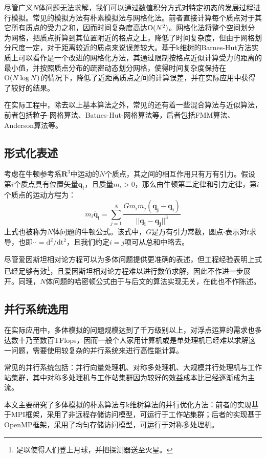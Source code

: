 \documentclass[lang=cn,11pt,a4paper,cite=authoryear]{elegantpaper}
\begin{document}
尽管广义$N$体问题无法求解，我们可以通过数值积分方式对特定初态的发展过程进行模拟。常见的模拟方法有朴素模拟法与网格化法。前者直接计算每个质点对于其它所有质点的受力之和，因而时间复杂度高达$\text O(N^2)$。网格化法将整个空间划分为网格，把质点折算到其位置附近的格点之上，降低了时间复杂度，但由于网格划分尺度一定，对于距离较近的质点来说误差较大。基于k维树的Barnes-Hut方法实质上可以看作是一个改进的网格化方法，其通过限制按格点近似计算受力的距离的最小值，并按照质点分布的疏密动态划分网格，使得时间复杂度保持在$\text O(N\log N)$的情况下，降低了近距离质点之间的计算误差，并在实际应用中获得了较好的结果。

在实际工程中，除去以上基本算法之外，常见的还有着一些混合算法与近似算法，前者包括粒子-网格算法、Batnes-Hut-网格算法等，后者包括FMM算法、Anderson算法等。

\subsection{形式化表述}

考虑在牛顿参考系$\mathbf R^3$中运动的$N$个质点，其之间的相互作用只有万有引力。假设第$i$个质点具有位置矢量$\mathbf q_i$，且质量$m_i>0$，那么由牛顿第二定律和引力定律，第$i$个质点的运动方程为：
\[
m_i\mathbf{\ddot{q_i}}=\sum_{j=1}^N \frac{Gm_im_j(\mathbf{q_j}-\mathbf{q_i})}{||\mathbf{q_i}-\mathbf{q_j}||^3}
\]
上式也被称为$N$体问题的牛顿公式。该式中，$G$是万有引力常数，圆点$\cdot$表示对$t$求导，也即$\cdot\cdot=\mathrm {d^2/dt^2}$，且我们约定$i=j$项可从总和中略去。

尽管爱因斯坦相对论方程可以为多体问题提供更准确的表述，但工程经验表明上式已经足够有效\footnote{足以使得人们登上月球，并把探测器送至火星。}，且爱因斯坦相对论方程难以进行数值求解，因此不作进一步展开。同理，$N$体问题的哈密顿公式由于与后文的算法实现无关，在此也不作陈述。

\subsection{并行系统选用}

在实际应用中，多体模拟的问题规模达到了千万级别以上，对浮点运算的需求也多达数十乃至数百TFlops，因而一般个人家用计算机或是单处理机已经难以求解这一问题，需要使用较复杂的并行系统来进行高性能计算。

常见的并行系统包括：并行向量处理机、对称多处理机、大规模并行处理机与工作站集群，其中对称多处理机与工作站集群因为较好的效益成本比已经逐渐成为主流。

本文主要研究了多体模拟的朴素算法与k维树算法的并行优化方法：前者的实现基于MPI框架，采用了非远程存储访问模型，可运行于工作站集群；后者的实现基于OpenMP框架，采用了均匀存储访问模型，可运行于对称多处理机。
\end{document}

